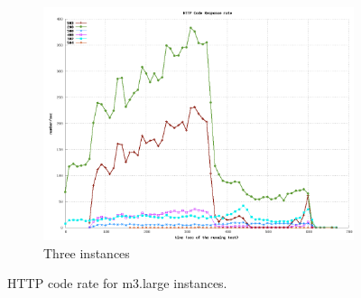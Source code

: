 \documentclass[dvips,12pt]{article}
\begin{document}
\begin{figure}[h!]
\begin{subfigure}[b]{0.3\textwidth}
        \includegraphics[width=\textwidth]{images/horizontal_m3large_dbm3large/http_4.png}
        \caption{Three instances}
    \end{subfigure}
    \caption{HTTP code rate for m3.large instances.}
\end{figure}
\end{document}
